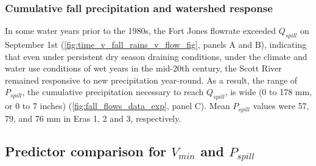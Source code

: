 \documentclass[hess, manuscript]{copernicus}
\begin{document}
\subsubsection{Cumulative fall precipitation and watershed response}

In some water years prior to the 1980s, the Fort Jones flowrate exceeded
\(Q_{spill}\) on September 1st
(\autoref{fig:time_v_fall_rains_v_flow_fig}, panels A and B), indicating
that even under persistent dry season draining conditions, under the
climate and water use conditions of wet years in the mid-20th century,
the Scott River remained responsive to new precipitation year-round. As
a result, the range of \(P_{spill}\), the cumulative precipitation
necessary to reach \(Q_{spill}\), is wide (0 to 178 mm, or 0 to 7
inches) (\autoref{fig:fall_flows_data_exp}, panel C). Mean \(P_{spill}\)
values were 57, 79, and 76 mm in Eras 1, 2 and 3, respectively.

\subsection{\texorpdfstring{Predictor comparison for \(V_{min}\) and
\(P_{spill}\)}{Predictor comparison for V\_\{min\} and P\_\{spill\}}}
\end{document}
